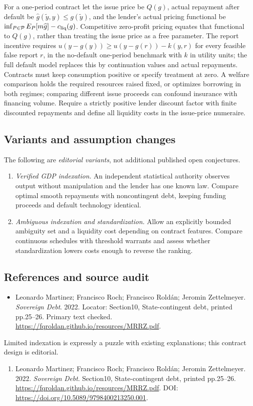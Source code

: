 \documentclass[11pt,a4paper]{article}
\begin{document}
For a one-period contract let the issue price be \(Q(g)\), actual repayment after default be \(\widehat g(\tilde y,y)\le g(\tilde y)\), and the lender's actual pricing functional be \(\inf_{P\in\mathcal P}E_P[m\widehat g]-c_{\rm liq}(g)\). Competitive zero-profit pricing equates that functional to \(Q(g)\), rather than treating the issue price as a free parameter. The report incentive requires \(u(y-g(y))\ge u(y-g(r))-k(y,r)\) for every feasible false report \(r\), in the no-default one-period benchmark with \(k\) in utility units; the full default model replaces this by continuation values and actual repayments. Contracts must keep consumption positive or specify treatment at zero. A welfare comparison holds the required resources raised fixed, or optimizes borrowing in both regimes; comparing different issue proceeds can confound insurance with financing volume. Require a strictly positive lender discount factor with finite discounted repayments and define all liquidity costs in the issue-price numeraire.
\subsection*{Variants and assumption changes}
The following are \emph{editorial variants}, not additional published open conjectures.
\begin{enumerate}
\item \emph{Verified GDP indexation.} An independent statistical authority observes output without manipulation and the lender has one known law. Compare optimal smooth repayments with noncontingent debt, keeping funding proceeds and default technology identical.
\item \emph{Ambiguous indexation and standardization.} Allow an explicitly bounded ambiguity set and a liquidity cost depending on contract features. Compare continuous schedules with threshold warrants and assess whether standardization lowers costs enough to reverse the ranking.
\end{enumerate}
\subsection*{References and source audit}
\begin{itemize}
\item Leonardo Martinez; Francisco Roch; Francisco Roldán; Jeromin Zettelmeyer. \emph{Sovereign Debt}. 2022. Locator: Section10, State-contingent debt, printed pp.25--26. Primary text checked. \url{https://fqroldan.github.io/resources/MRRZ.pdf}.
\end{itemize}
Limited indexation is expressly a puzzle with existing explanations; this contract design is editorial.
\begin{enumerate}\raggedright
\item\hypertarget{definitions:source:30007539:1}{} Leonardo Martinez; Francisco Roch; Francisco Roldán; Jeromin Zettelmeyer. 2022. \emph{Sovereign Debt}. Section10, State-contingent debt, printed pp.25--26.
\url{https://fqroldan.github.io/resources/MRRZ.pdf}.
DOI: \url{https://doi.org/10.5089/9798400213250.001}.
\end{enumerate}
\end{document}
